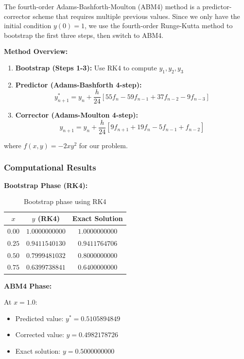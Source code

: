 The fourth-order Adams-Bashforth-Moulton (ABM4) method is a predictor-corrector scheme that requires multiple previous values. Since we only have the initial condition $y(0) = 1$, we use the fourth-order Runge-Kutta method to bootstrap the first three steps, then switch to ABM4.

\textbf{Method Overview:}
\begin{enumerate}
    \item \textbf{Bootstrap (Steps 1-3):} Use RK4 to compute $y_1, y_2, y_3$
    \item \textbf{Predictor (Adams-Bashforth 4-step):}
    $$y^*_{n+1} = y_n + \frac{h}{24}[55f_n - 59f_{n-1} + 37f_{n-2} - 9f_{n-3}]$$
    \item \textbf{Corrector (Adams-Moulton 4-step):}
    $$y_{n+1} = y_n + \frac{h}{24}[9f_{n+1} + 19f_n - 5f_{n-1} + f_{n-2}]$$
\end{enumerate}

where $f(x, y) = -2xy^2$ for our problem.

\subsubsection*{Computational Results}

\textbf{Bootstrap Phase (RK4):}

\begin{table}[h]
\centering
\begin{tabular}{ccc}
\toprule
$x$ & $y$ (RK4) & Exact Solution \\
\midrule
$0.00$ & $1.0000000000$ & $1.0000000000$ \\
$0.25$ & $0.9411540130$ & $0.9411764706$ \\
$0.50$ & $0.7999481032$ & $0.8000000000$ \\
$0.75$ & $0.6399738841$ & $0.6400000000$ \\
\bottomrule
\end{tabular}
\caption{Bootstrap phase using RK4}
\end{table}

\textbf{ABM4 Phase:}

At $x = 1.0$:
\begin{itemize}
    \item Predicted value: $y^* = 0.5105894849$
    \item Corrected value: $y = 0.4982178726$
    \item Exact solution: $y = 0.5000000000$
\end{itemize}


